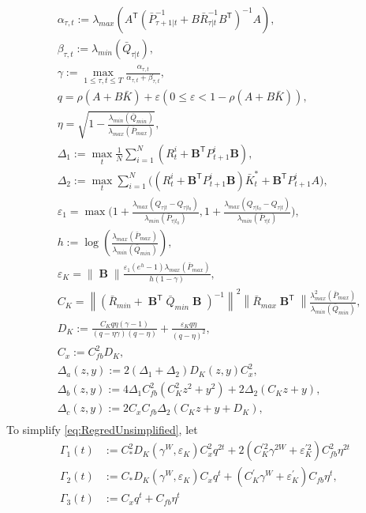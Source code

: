 \documentclass[letterpaper, 10 pt, conference]{ieeeconf}  %
\newcommand{\transpose}{\mathsf{T}}
\DeclareMathOperator{\contB}{\mathbf{B}}
\begin{document}
    \begin{align*}
        &\alpha_{\tau,t} := \lambda_{max}(A^{\transpose}(\bar{P}_{\tau+1|t}^{-1}+B\bar{R}_{\tau|t}^{-1}B^{\transpose})^{-1}A),\\
        &\beta_{\tau,t} := \lambda_{min}(\bar{Q}_{\tau|t}),\\ 
        &\gamma := \max_{1\leq \tau,t \leq T} \frac{\alpha_{\tau,t}}{\alpha_{\tau,t}+\beta_{\tau,t}},\\
        &q = \rho(A+B\bar{K}) + \varepsilon(0\leq \varepsilon < 1-\rho(A+B\bar{K})),\\
        &\eta = \sqrt{1-\frac{\lambda_{min}(\bar{Q}_{min})}{\lambda_{max}(\bar{P}_{max})}},\\
        &\Delta_{1} := \max_{t} \frac{1}{N}\sum_{i=1}^{N}(R_{t}^{i}+\mathbf{B}^{\transpose}P_{t+1}^{i}\mathbf{B}),\\
        &\Delta_{2} := \max_{t} \sum_{i=1}^{N}\bigg( (R_{t}^{i}+\mathbf{B}^{\transpose}P_{t+1}^{i}\mathbf{B})\bar{K}_{t}^{*}+\mathbf{B}^{\transpose}P_{t+1}^{i}A\bigg),\\
        &\varepsilon_{1} = \max\bigg(1+\frac{\lambda_{max}(Q_{\tau|t}-Q_{\tau|t_{0}})}{\lambda_{min}(\bar{P}_{\tau|t_{0}})},1+\frac{\lambda_{max}(Q_{\tau|t_{0}}-Q_{\tau|t})}{\lambda_{min}(\bar{P}_{\tau|t})}\bigg),\\
        &h := \log(\frac{\lambda_{max}(\bar{P}_{max})}{\lambda_{min}(\bar{Q}_{min})}),\\
        &\varepsilon_{K} =\|\contB\|\frac{\varepsilon_{1}(e^{h}-1)\lambda_{max}(\bar{P}_{max})}{h(1-\gamma)},\\
        &C_{K} = \left\|(\bar{R}_{min}+\contB^{\mathsf{T}}\bar{Q}_{min}\contB)^{-1}\right\|^{2}\left\|\bar{R}_{max}\contB^{\mathsf{T}}\right\|\frac{\lambda_{max}^{2}(\bar{P}_{max})}{\lambda_{min}(\bar{Q}_{min})},\\
        &D_{K} := \frac{C_{K}q\eta(\gamma-1)}{(q-\eta\gamma)(q-\eta)} + \frac{\varepsilon_{K}q\eta}{(q-\eta)^{2}},\\
        &C_{x} := C_{fb}^{2}D_{K},\\
        &\Delta_{a}(z,y) := 2(\Delta_{1}+\Delta_{2})D_{K}(z,y)C_{x}^{2},\\
        &\Delta_{b}(z,y) := 4\Delta_{1}C_{fb}^{2}(C_{K}^{2}z^{2}+y^{2})+2\Delta_{2}(C_{K}z+y),\\
        &\Delta_{c}(z,y) := 2C_{x}C_{fb}\Delta_{2}(C_{K}z+y+D_{K}),\\
    \end{align*}
To simplify \eqref{eq:RegredUnsimplified}, let
\begin{align*}
    \Gamma_1(t) &:= C_{*}^{2}D_{K}(\gamma^{W},\varepsilon_{K})C_{x}^{2}q^{2t} + 2(C_{K}^{'2}\gamma^{2W}+\varepsilon_{K}^{'2})C_{fb}^{2}\eta^{2t} \\
    \Gamma_2(t) &:= C_{*}D_{K}(\gamma^{W},\varepsilon_{K})C_{x}q^{t}+(C_{K}^{'}\gamma^{W}+\varepsilon_{K}^{'})C_{fb}\eta^{t},\\
    \Gamma_3(t) &:= C_{x}q^{t}+C_{fb}\eta^{t}
\end{align*}
\end{document}
